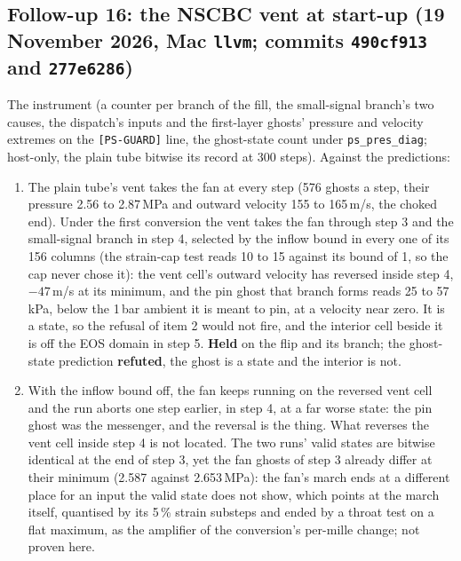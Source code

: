 \documentclass[11pt,a4paper]{article}
\newcommand{\code}[1]{\texttt{\small #1}}
\begin{document}
\subsection{Follow-up 16: the NSCBC vent at start-up (19 November 2026, Mac \code{llvm}; commits \code{490cf913} and \code{277e6286})}
\label{sec:fu16}

The instrument (a counter per branch of the fill, the small-signal
branch's two causes, the dispatch's inputs and the first-layer ghosts'
pressure and velocity extremes on the \code{[PS-GUARD]} line, the
ghost-state count under \code{ps\_pres\_diag}; host-only, the plain tube
bitwise its record at 300 steps).  Against the predictions:
\begin{enumerate}[nosep]
\item The plain tube's vent takes the fan at every step (576 ghosts a
      step, their pressure 2.56 to 2.87\,MPa and outward velocity 155 to
      165\,m/s, the choked end).  Under the first conversion the vent
      takes the fan through step 3 and the small-signal branch in step
      4, selected by the inflow bound in every one of its 156 columns
      (the strain-cap test reads 10 to 15 against its bound of 1, so
      the cap never chose it): the vent cell's outward velocity has
      reversed inside step 4, $-47$\,m/s at its minimum, and the pin
      ghost that branch forms reads 25 to 57\,kPa, below the 1\,bar
      ambient it is meant to pin, at a velocity near zero.  It is a
      state, so the refusal of item 2 would not fire, and the interior
      cell beside it is off the EOS domain in step 5.  \textbf{Held} on
      the flip and its branch; the ghost-state prediction
      \textbf{refuted}, the ghost is a state and the interior is not.
\item With the inflow bound off, the fan keeps running on the reversed
      vent cell and the run aborts one step earlier, in step 4, at a far
      worse state: the pin ghost was the messenger, and the reversal is
      the thing.  What reverses the vent cell inside step 4 is not
      located.  The two runs' valid states are bitwise identical at the
      end of step 3, yet the fan ghosts of step 3 already differ at their
      minimum (2.587 against 2.653\,MPa): the fan's march ends at a
      different place for an input the valid state does not show, which
      points at the march itself, quantised by its 5\,\% strain substeps
      and ended by a throat test on a flat maximum, as the amplifier of
      the conversion's per-mille change; not proven here.
\end{enumerate}
\end{document}
